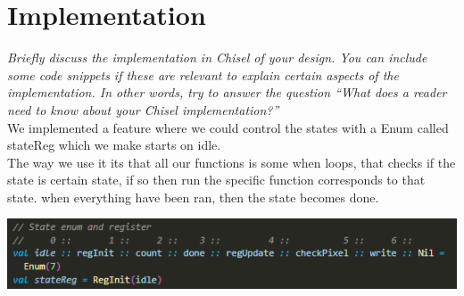 \documentclass[a4paper, english]{article}
\numberwithin{equation}{section}
\begin{document}
\begin{figure}[H]
\begin{subfigure}[t]{.35\textwidth}
{
        }%
    \end{subfigure}
\end{figure}
\section{Implementation}
\textit{Briefly discuss the implementation in Chisel of your design. You can include some code snippets if these are relevant to explain certain aspects of the implementation. In other words, try to answer the question ``What does a reader need to know about your Chisel implementation?''}
\\
We implemented a feature where we could control the states with a Enum called stateReg which we make starts on idle. \\
The way we use it its that all our functions is some when loops, that checks if the state is certain state, if so then run the specific function corresponds to that state. when everything have been ran, then the state becomes done. 
\begin{center}
    \includegraphics[]{Pictures/StateEnum.png}
\end{center}
\end{document}
